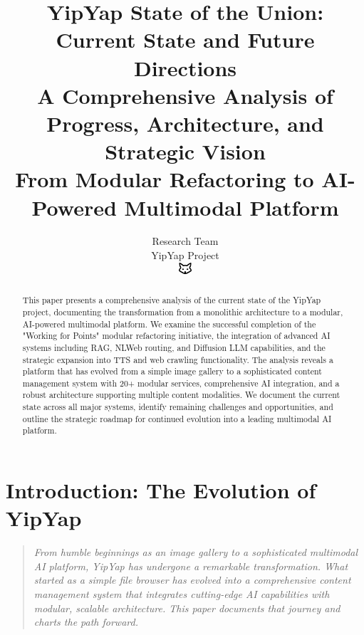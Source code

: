 \documentclass[11pt]{article}
\begin{document}
\title{\textbf{YipYap State of the Union: Current State and Future Directions} \\
\Large{A Comprehensive Analysis of Progress, Architecture, and Strategic Vision} \\
\large{From Modular Refactoring to AI-Powered Multimodal Platform}}

\author{Research Team\\
YipYap Project\\
\includegraphics[width=0.5cm]{favicon.pdf}}

\maketitle

\begin{abstract}
This paper presents a comprehensive analysis of the current state of the YipYap project, documenting the transformation from a monolithic architecture to a modular, AI-powered multimodal platform. We examine the successful completion of the "Working for Points" modular refactoring initiative, the integration of advanced AI systems including RAG, NLWeb routing, and Diffusion LLM capabilities, and the strategic expansion into TTS and web crawling functionality. The analysis reveals a platform that has evolved from a simple image gallery to a sophisticated content management system with 20+ modular services, comprehensive AI integration, and a robust architecture supporting multiple content modalities. We document the current state across all major systems, identify remaining challenges and opportunities, and outline the strategic roadmap for continued evolution into a leading multimodal AI platform.
\end{abstract}

\tableofcontents
\newpage

\section{Introduction: The Evolution of YipYap}

\begin{quote}
\emph{From humble beginnings as an image gallery to a sophisticated multimodal AI platform, YipYap has undergone a remarkable transformation. What started as a simple file browser has evolved into a comprehensive content management system that integrates cutting-edge AI capabilities with modular, scalable architecture. This paper documents that journey and charts the path forward.}
\end{quote}
\end{document}
